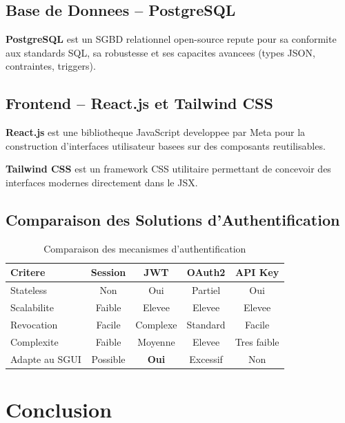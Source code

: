 \documentclass[12pt,a4paper]{report}
\begin{document}
\subsection{Base de Donnees -- PostgreSQL}

\textbf{PostgreSQL} est un SGBD relationnel open-source repute pour sa
conformite aux standards SQL, sa robustesse et ses capacites avancees
(types JSON, contraintes, triggers).

\subsection{Frontend -- React.js et Tailwind CSS}

\textbf{React.js} est une bibliotheque JavaScript developpee par Meta
pour la construction d'interfaces utilisateur basees sur des composants
reutilisables.

\textbf{Tailwind CSS} est un framework CSS utilitaire permettant de
concevoir des interfaces modernes directement dans le JSX.

\subsection{Comparaison des Solutions d'Authentification}

\begin{table}[H]
\centering
\caption{Comparaison des mecanismes d'authentification}
\begin{tabular}{lcccc}
\toprule
\textbf{Critere}    & \textbf{Session} & \textbf{JWT} & \textbf{OAuth2} & \textbf{API Key} \\
\midrule
Stateless           & Non       & Oui         & Partiel & Oui          \\
Scalabilite         & Faible    & Elevee      & Elevee  & Elevee       \\
Revocation          & Facile    & Complexe    & Standard & Facile      \\
Complexite          & Faible    & Moyenne     & Elevee  & Tres faible  \\
Adapte au SGUI      & Possible  & \textbf{Oui}& Excessif& Non          \\
\bottomrule
\end{tabular}
\end{table}

\section{Conclusion}
\end{document}
